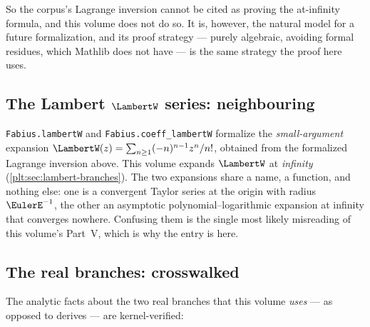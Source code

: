 \documentclass[11pt,oneside]{article}
\theoremstyle{plain}
\theoremstyle{definition}
\theoremstyle{remark}
\begin{document}
So the corpus's Lagrange inversion cannot be cited as proving the at-infinity
formula, and this volume does not do so.  It is, however, the natural model
for a future formalization, and its proof strategy --- purely algebraic,
avoiding formal residues, which Mathlib does not have --- is the same strategy
the proof here uses.

\subsection{The Lambert \texorpdfstring{\(\LambertW\)}{W} series: neighbouring}

\texttt{Fabius.lambertW} and \texttt{Fabius.coeff\_lambertW} formalize the
\emph{small-argument} expansion
\(\LambertW(z)=\sum_{n\ge1}(-n)^{n-1}z^{n}/n!\), obtained from the formalized
Lagrange inversion above.  This volume expands \(\LambertW\) at \emph{infinity}
(\cref{plt:sec:lambert-branches}).  The two expansions share a name, a
function, and nothing else: one is a convergent Taylor series at the origin
with radius \(\EulerE^{-1}\), the other an asymptotic polynomial--logarithmic
expansion at infinity that converges nowhere.  Confusing them is the single
most likely misreading of this volume's Part~V, which is why the entry is here.

\subsection{The real branches: crosswalked}

The analytic facts about the two real branches that this volume \emph{uses}
--- as opposed to derives --- are kernel-verified:
\end{document}
